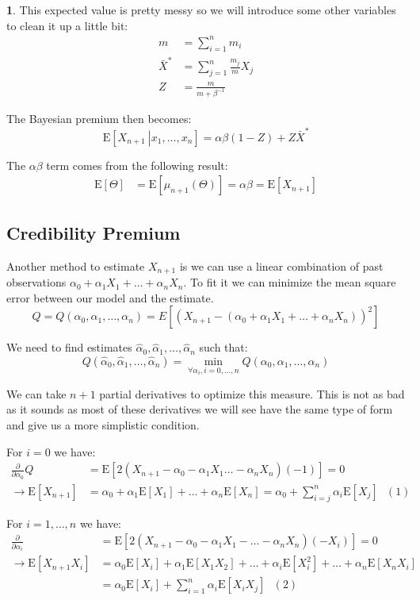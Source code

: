 \documentclass[english,12pt]{article}
\theoremstyle{plain}
\theoremstyle{definition}
\newtheorem*{example}{\protect\examplename}
\theoremstyle{definition} %
\providecommand{\examplename}{Example}
\newcommand{\ex}[1]{\mbox{E} \left[ #1 \right]}
\newcommand{\condex}[2]{\mbox{E} \left[ \left. #1 \ \right\vert \left. #2 \right. \right]}
\begin{document}
\begin{example}
This expected value is pretty messy so we will introduce some other variables to clean it up a little bit:
\begin{align*}
m&=\sum\limits_{i=1}^nm_i\\
\bar{X}^\ast&=\sum\limits_{j=1}^n\frac{m_j}{m}X_j\\
Z&=\frac{m}{m+\beta^{-1}}
\end{align*}

The Bayesian premium then becomes:
\[\condex{X_{n+1}}{x_1,\ldots,x_n}=\alpha\beta(1-Z)+Z\bar{X}^\ast\]

The $\alpha\beta$ term comes from the following result:
\begin{align*}
\ex{\Theta}
&=\ex{\mu_{n+1}(\Theta)}
=\alpha\beta
=\ex{X_{n+1}}
\end{align*}
\end{example}

\subsection{Credibility Premium}
Another method to estimate $X_{n+1}$ is we can use a linear combination of past observations $\alpha_0+\alpha_1X_1+\ldots+\alpha_nX_n$.  To fit it we can minimize the mean square error between our model and the estimate.
\[Q=Q(\alpha_0,\alpha_1,\ldots,\alpha_n)=E\left[\left(X_{n+1}-(\alpha_0+\alpha_1X_1+\ldots+\alpha_nX_n)\right)^2\right]\]

We need to find estimates $\hat{\alpha}_0,\hat{\alpha}_1,\ldots,\hat{\alpha}_n$ such that:
\[Q(\hat{\alpha}_0,\hat{\alpha}_1,\ldots,\hat{\alpha}_n)=\min_{\forall\alpha_i, i=0,\ldots,n}Q(\alpha_0,\alpha_1,\ldots,\alpha_n)\]

We can take $n+1$ partial derivatives to optimize this measure.  This is not as bad as it sounds as most of these derivatives we will see have the same type of form and give us a more simplistic condition.

For $i=0$ we have:
\begin{align*}
\frac{\partial}{\partial\alpha_0}Q
&=\ex{2(X_{n+1}-\alpha_0-\alpha_1X_1\ldots-\alpha_nX_n)(-1)}=0\\
\rightarrow \ex{X_{n+1}}&=\alpha_0+\alpha_1\ex{X_1}+\ldots+\alpha_n\ex{X_n}
=\alpha_0+\sum\limits_{i=j}^n\alpha_i\ex{X_j}\text{ }(1)
\end{align*}

For $i=1,\ldots,n$ we have:
\begin{align*}
\frac{\partial}{\partial\alpha_i}&=\ex{2(X_{n+1}-\alpha_0-\alpha_1X_1-\ldots-\alpha_nX_n)(-X_i)}=0\\
\rightarrow \ex{X_{n+1}X_i}&=\alpha_0\ex{X_i}+\alpha_1\ex{X_1X_2}+\ldots+\alpha_i\ex{X_i^2}+\ldots+\alpha_n\ex{X_nX_i}\\
&=\alpha_0\ex{X_i}+\sum\limits_{i=1}^n\alpha_i\ex{X_iX_j}\text{ }(2)
\end{align*}
\end{document}
